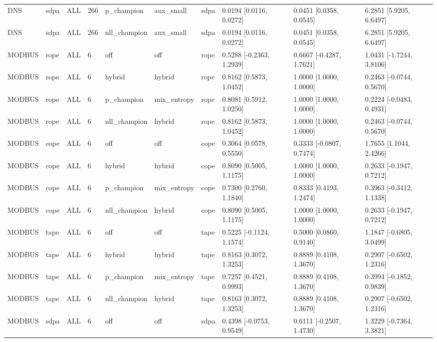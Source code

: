 \begin{tabular}{llllllllll}
DNS & sdpa & ALL & 266 & p\_champion & aux\_small & sdpa & 0.0194 [0.0116, 0.0272] & 0.0451 [0.0358, 0.0545] & 6.2851 [5.9205, 6.6497] \\
DNS & sdpa & ALL & 266 & nll\_champion & aux\_small & sdpa & 0.0194 [0.0116, 0.0272] & 0.0451 [0.0358, 0.0545] & 6.2851 [5.9205, 6.6497] \\
MODBUS & rope & ALL & 6 & off & off & rope & 0.5288 [-0.2363, 1.2939] & 0.6667 [-0.4287, 1.7621] & 1.0431 [-1.7244, 3.8106] \\
MODBUS & rope & ALL & 6 & hybrid & hybrid & rope & 0.8162 [0.5873, 1.0452] & 1.0000 [1.0000, 1.0000] & 0.2463 [-0.0744, 0.5670] \\
MODBUS & rope & ALL & 6 & p\_champion & mix\_entropy & rope & 0.8081 [0.5912, 1.0250] & 1.0000 [1.0000, 1.0000] & 0.2224 [-0.0483, 0.4931] \\
MODBUS & rope & ALL & 6 & nll\_champion & hybrid & rope & 0.8162 [0.5873, 1.0452] & 1.0000 [1.0000, 1.0000] & 0.2463 [-0.0744, 0.5670] \\
MODBUS & cope & ALL & 6 & off & off & cope & 0.3064 [0.0578, 0.5550] & 0.3333 [-0.0807, 0.7474] & 1.7655 [1.1044, 2.4266] \\
MODBUS & cope & ALL & 6 & hybrid & hybrid & cope & 0.8090 [0.5005, 1.1175] & 1.0000 [1.0000, 1.0000] & 0.2633 [-0.1947, 0.7212] \\
MODBUS & cope & ALL & 6 & p\_champion & mix\_entropy & cope & 0.7300 [0.2760, 1.1840] & 0.8333 [0.4193, 1.2474] & 0.3963 [-0.3412, 1.1338] \\
MODBUS & cope & ALL & 6 & nll\_champion & hybrid & cope & 0.8090 [0.5005, 1.1175] & 1.0000 [1.0000, 1.0000] & 0.2633 [-0.1947, 0.7212] \\
MODBUS & tape & ALL & 6 & off & off & tape & 0.5225 [-0.1124, 1.1574] & 0.5000 [0.0860, 0.9140] & 1.1847 [-0.6805, 3.0499] \\
MODBUS & tape & ALL & 6 & hybrid & hybrid & tape & 0.8163 [0.3072, 1.3253] & 0.8889 [0.4108, 1.3670] & 0.2907 [-0.6502, 1.2316] \\
MODBUS & tape & ALL & 6 & p\_champion & mix\_entropy & tape & 0.7257 [0.4521, 0.9993] & 0.8889 [0.4108, 1.3670] & 0.3994 [-0.1852, 0.9839] \\
MODBUS & tape & ALL & 6 & nll\_champion & hybrid & tape & 0.8163 [0.3072, 1.3253] & 0.8889 [0.4108, 1.3670] & 0.2907 [-0.6502, 1.2316] \\
MODBUS & sdpa & ALL & 6 & off & off & sdpa & 0.4398 [-0.0753, 0.9549] & 0.6111 [-0.2507, 1.4730] & 1.3229 [-0.7364, 3.3821] \\

\end{tabular}
